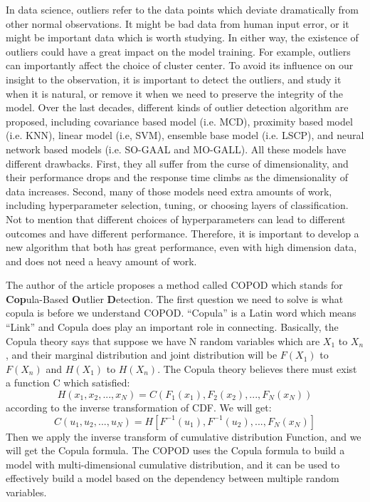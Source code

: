 \documentclass[12pt, a4paper, oneside]{article}
\begin{document}
\newpage
In data science, outliers refer to the data points which deviate dramatically from other normal observations. It might be bad data from human input error, or it might be important data which is worth studying. In either way, the existence of outliers could have a great impact on the model training. For example, outliers can importantly affect the choice of cluster center. To avoid its influence on our insight to the observation, it is important to detect the outliers, and study it when it is natural, or remove it when we need to preserve the integrity of the model. Over the last decades, different kinds of outlier detection algorithm are proposed, including covariance based model (i.e. MCD), proximity based model (i.e. KNN), linear model (i.e, SVM), ensemble base model (i.e. LSCP), and neural network based models (i.e. SO-GAAL and MO-GALL). All these models have different drawbacks. First, they all suffer from the curse of dimensionality, and their performance drops and the response time climbs as the dimensionality of data increases. Second, many of those models need extra amounts of work, including hyperparameter selection, tuning, or choosing layers of classification. Not to mention that different choices of hyperparameters can lead to different outcomes and have different performance. Therefore, it is important to develop a new algorithm that both has great performance, even with high dimension data, and does not need a heavy amount of work.
\par The author of the article proposes a method called COPOD which stands for \textbf{Cop}ula-Based \textbf{O}utlier \textbf{D}etection. The first question we need to solve is what copula is before we understand COPOD. “Copula” is a Latin word which means “Link” and Copula does play an important role in connecting. Basically, the Copula theory says that suppose we have N random variables which are $X_1$ to $X_n$, and their marginal distribution and joint distribution will be $F(X_1)$ to $F(X_n)$ and $H(X_1)$ to $H(X_n)$. The Copula theory believes there must exist a function C which satisfied:
\[H(x_1,x_2,...,x_N) = C(F_1(x_1), F_2(x_2),...,F_N(x_N))\]
according to the inverse transformation of CDF. We will get:
\[C(u_1,u_2,...,u_N) = H[F^{-1}(u_1),F^{-1}(u_2),...,F_N(x_N)]\]
Then we apply the inverse transform of cumulative distribution Function, and we will get the Copula formula. The COPOD uses the Copula formula to build a model with multi-dimensional cumulative distribution, and it can be used to effectively build a model based on the dependency between multiple random variables. 
\end{document}
